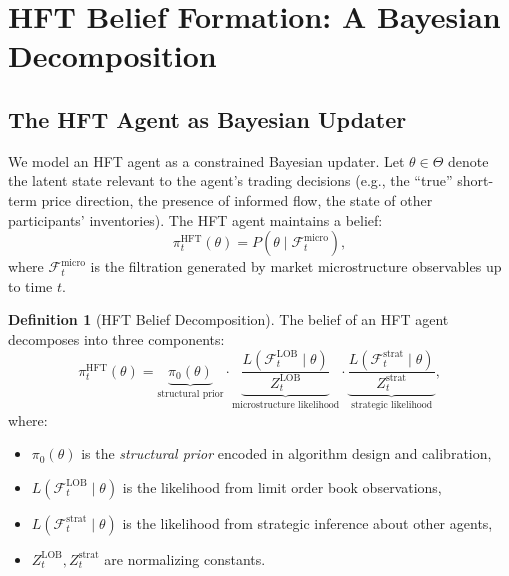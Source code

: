 \documentclass[12pt,a4paper]{article}
\theoremstyle{definition}
\newtheorem{definition}[theorem]{Definition}
\newcommand{\F}{\mathcal{F}}
\begin{document}
\section{HFT Belief Formation: A Bayesian Decomposition}\label{sec:hft-belief}

\subsection{The HFT Agent as Bayesian Updater}

We model an HFT agent as a constrained Bayesian updater. Let $\theta \in \Theta$ denote the latent state relevant to the agent's trading decisions (e.g., the ``true'' short-term price direction, the presence of informed flow, the state of other participants' inventories). The HFT agent maintains a belief:
\begin{equation}\label{eq:hft-belief}
  \pi_t^{\mathrm{HFT}}(\theta) = P(\theta \mid \F_t^{\mathrm{micro}}),
\end{equation}
where $\F_t^{\mathrm{micro}}$ is the filtration generated by market microstructure observables up to time $t$.

\begin{definition}[HFT Belief Decomposition]\label{def:hft-decomposition}
The belief of an HFT agent decomposes into three components:
\begin{equation}\label{eq:belief-decomposition}
  \pi_t^{\mathrm{HFT}}(\theta) = \underbrace{\pi_0(\theta)}_{\text{structural prior}} \cdot \underbrace{\frac{L(\F_t^{\mathrm{LOB}} \mid \theta)}{Z_t^{\mathrm{LOB}}}}_{\text{microstructure likelihood}} \cdot \underbrace{\frac{L(\F_t^{\mathrm{strat}} \mid \theta)}{Z_t^{\mathrm{strat}}}}_{\text{strategic likelihood}},
\end{equation}
where:
\begin{itemize}
  \item $\pi_0(\theta)$ is the \emph{structural prior} encoded in algorithm design and calibration,
  \item $L(\F_t^{\mathrm{LOB}} \mid \theta)$ is the likelihood from limit order book observations,
  \item $L(\F_t^{\mathrm{strat}} \mid \theta)$ is the likelihood from strategic inference about other agents,
  \item $Z_t^{\mathrm{LOB}}, Z_t^{\mathrm{strat}}$ are normalizing constants.
\end{itemize}
\end{definition}
\end{document}
